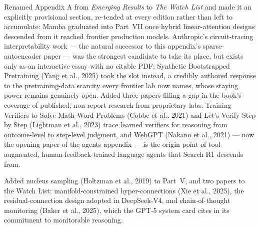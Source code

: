 \medskip
Renamed Appendix A from \emph{Emerging Results} to \emph{The Watch List} and made it an explicitly
provisional section, re-tended at every edition rather than left to accumulate: Mamba graduated
into Part~VII once hybrid linear-attention designs descended from it reached frontier production
models. Anthropic's circuit-tracing interpretability work --- the natural successor to this
appendix's sparse-autoencoder paper --- was the strongest candidate to take its place, but exists
only as an interactive essay with no citable PDF; Synthetic Bootstrapped Pretraining (Yang et al.,
2025) took the slot instead, a credibly authored response to the pretraining-data scarcity every
frontier lab now names, whose staying power remains genuinely open. Added three papers filling a
gap in the book's coverage of published, non-report research from proprietary labs: Training
Verifiers to Solve Math Word Problems (Cobbe et al., 2021) and Let's Verify Step by Step (Lightman
et al., 2023) trace learned verifiers for reasoning from outcome-level to step-level judgment,
and WebGPT (Nakano et al., 2021) --- now the opening paper of the agents appendix --- is the origin
point of tool-augmented, human-feedback-trained language agents that Search-R1 descends from.

\medskip
Added nucleus sampling (Holtzman et al., 2019) to Part~V, and two papers to the Watch List:
manifold-constrained hyper-connections (Xie et al., 2025), the residual-connection design adopted
in DeepSeek-V4, and chain-of-thought monitoring (Baker et al., 2025), which the GPT-5 system card
cites in its commitment to monitorable reasoning.

